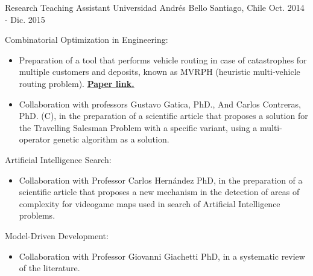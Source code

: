 
\begin{cventries}

  \cventry
    {Research Teaching Assistant} %
    {Universidad Andrés Bello} %
    {Santiago, Chile} %
    {Oct. 2014 - Dic. 2015} %
    {
      \begin{cvitems} %
      	\item {Combinatorial Optimization in Engineering:}
      		\begin{itemize}
      			\item {Preparation of a tool that performs vehicle routing in case of catastrophes for multiple customers and deposits, known as MVRPH (heuristic multi-vehicle routing problem). \href{http://revistas.ustabuca.edu.co/index.php/ITECKNE/article/view/1631}{\textbf{Paper link.}}}
      			\item {Collaboration with professors Gustavo Gatica, PhD., And Carlos Contreras, PhD. (C), in the preparation of a scientific article that proposes a solution for the Travelling Salesman Problem with a specific variant, using a multi-operator genetic algorithm as a solution.}
      		\end{itemize}
      	\item {Artificial Intelligence Search:}
      	\begin{itemize}
      		\item {Collaboration with Professor Carlos Hernández PhD, in the preparation of a scientific article that proposes a new mechanism in the detection of areas of complexity for videogame maps used in search of Artificial Intelligence problems.}
      	\end{itemize}
      	\item {Model-Driven Development:}
      	\begin{itemize}
      		\item {Collaboration with Professor Giovanni Giachetti PhD, in a systematic review of the literature.}
      	\end{itemize}
      \end{cvitems}
    }
\end{cventries}